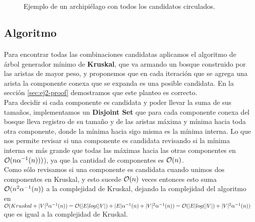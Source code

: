 \documentclass[../main.tex]{subfiles}
\begin{document}
\begin{figure}[H]
\centering

  
\caption{Ejemplo de un archipiélago con todos los candidatos circulados.}
\label{fig:ej2-ex}
\end{figure}

\subsection{Algoritmo}
\label{sec:ej2-algorithm}
\paragraph{} Para encontrar todas las combinaciones candidatas aplicamos el algoritmo de árbol generador mínimo de \textbf{Kruskal}, que va armando un bosque construido por las aristas de mayor peso, y proponemos que en cada iteración que se agrega una arista la componente conexa que se expanda es una posible candidata. En la sección \ref{sec:ej2-proof} demostramos que este planteo es correcto. \\
Para decidir si cada componente es candidata y poder llevar la suma de sus tamaños, implementamos un \textbf{Disjoint Set} que para cada componente conexa del bosque lleva registro de su tamaño y de las aristas máxima y mínima hacia toda otra componente, donde la mínima hacia sigo misma es la mínima interna. Lo que nos permite revisar si una componente es candidata revisando si la mínima interna es más grande que todas las máximas hacia las otras componentes en \(\mathcal{O}(n\alpha^{-1}(n)))\)), ya que la cantidad de componentes es \(\mathcal{O}(n)\). \\
Como sólo revisamos si una componente es candidata cuando unimos dos componentes en Kruskal, y esto sucede \(\mathcal{O}(n)\) veces entonces esto suma \(\mathcal{O}(n^{2}\alpha^{-1}(n))\) a la complejidad de Kruskal, dejando la complejidad del algoritmo en \(\mathcal{O}(Kruskal + |V|^{2}\alpha^{-1}(n)) = \mathcal{O}(|E|log(|V|) + |E|\alpha^{-1}(n) +|V|^{2}\alpha^{-1}(n)) \overset{}{=} \mathcal{O}(|E|log(|V|) + |V|^{2}\alpha^{-1}(n))\) que es igual a la complejidad de Kruskal. %
\end{document}
